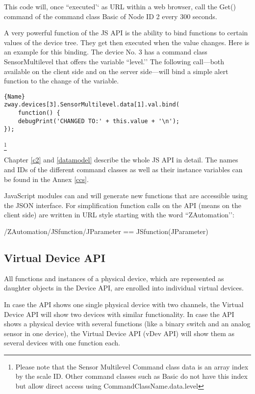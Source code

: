 This code will, once ``executed’‘ as URL within a web browser, call the Get() command
of the command class Basic of Node ID 2 every 300 seconds.

A very powerful function of the JS API is the ability to bind functions to certain values 
of the device tree. They get then executed when the value changes. Here is an example 
for this binding. The device No. 3 has a command class SensorMultilevel that offers 
the variable ``level.’’ The following call---both available on the client side and 
on the server side---will bind a simple alert function to the change of the variable.

\begin{lstlisting}[caption=Bind a function, basicstyle=\small]{Name}
zway.devices[3].SensorMultilevel.data[1].val.bind( 
	function() {
	debugPrint('CHANGED TO:' + this.value + '\n');
});
\end{lstlisting}

\footnote{Please note that the Sensor Multilevel Command class data is an array index 
by the scale ID. Other command classes such as Basic do not have this index but allow 
direct access using CommandClassName.data.level}

Chapter \ref{c2} and \ref{datamodel} describe the whole JS API in detail. The 
names and IDs of the different command classes as well as their instance variables 
can be found in the Annex \ref{ccs}.

JavaScript modules can and will generate new functions that are accessible using the 
JSON interface. For simplification function calls on the API (means on the client side) 
are written in URL style starting with the word ``ZAutomation’’:


\begin{center}
/ZAutomation/JSfunction/JParameter
== JSfunction(JParameter)
\end{center}

\subsection{Virtual Device API}

All functions and instances of a physical device, which are represented as daughter objects
in the \zwave Device API, are enrolled into individual virtual devices.

In case the \zwave API shows one single physical device with two channels, the Virtual 
Device API will show two devices with similar functionality. In case the \zwave API shows 
a physical device with several functions (like a binary switch and an analog sensor in 
one device), the Virtual Device API (vDev API) will show them as several devices with 
one function each.

